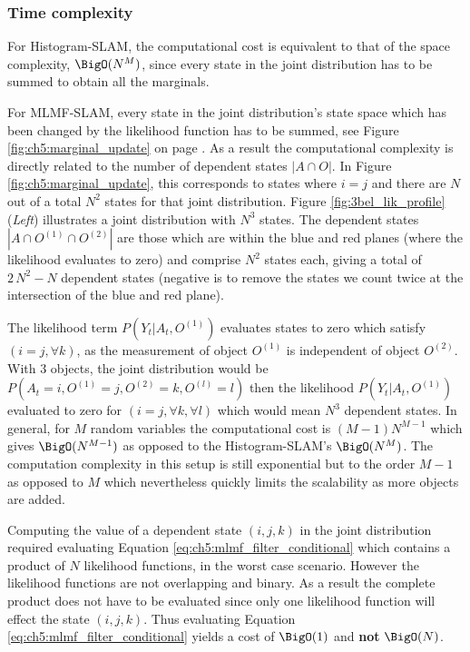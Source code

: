 \subsubsection{Time complexity}

For Histogram-SLAM, the computational cost is equivalent to that of the space complexity, $\BigO(N^M)$,
since every state in the joint distribution has to be summed to obtain all the marginals.

For MLMF-SLAM, every state in the joint distribution's state space which has been changed by the likelihood function 
has to be summed, see Figure \ref{fig:ch5:marginal_update} on page \pageref{fig:ch5:marginal_update}. As a result the computational complexity is directly 
related to the number of dependent states $|A \cap O|$. In Figure \ref{fig:ch5:marginal_update}, this corresponds to states where $i = j$ and there are $N$ out 
of a total $N^2$ states for that joint distribution. Figure \ref{fig:3bel_lik_profile} (\textit{Left})
illustrates a joint distribution with $N^3$ states. The dependent states $|A \cap O^{(1)} \cap O^{(2)}|$ are those which 
are within the blue and red planes (where the likelihood evaluates to zero) and comprise $N^2$ states each, 
giving a total of $2\,N^2 - N$ dependent states (negative is to remove the states we count twice at the intersection of the blue and red plane). 

The likelihood term $P(Y_t|A_t,O^{(1)})$ evaluates states to zero which satisfy ${(i=j,\forall k)}$, as 
the measurement of object $O^{(1)}$ is independent of object $O^{(2)}$. With 3 objects, the joint distribution would be
${P(A_t=i,O^{(1)}=j,O^{(2)}=k,O^{(l)}=l)}$ then the likelihood $P(Y_t|A_t,O^{(1)})$  evaluated to 
zero for ${(i=j,\forall k,\forall l)}$ which would mean $N^3$ dependent states.
In general, for $M$ random variables the computational cost is $(M-1) N^{M-1}$ which gives $\BigO(N^{M-1})$ as opposed to the Histogram-SLAM's $\BigO(N^M)$. 
The computation complexity in this setup is still exponential but to the order $M-1$ as opposed to $M$ which nevertheless 
quickly limits the scalability as more objects are added. 

Computing the value of a dependent state ${(i,j,k)}$ in the joint distribution required evaluating Equation \ref{eq:ch5:mlmf_filter_conditional} which
contains a product of $N$ likelihood functions, in the worst case scenario. However the likelihood functions are not overlapping and binary. As a result the complete product
does not have to be evaluated since only one likelihood function will effect the state ${(i,j,k)}$. Thus evaluating Equation \ref{eq:ch5:mlmf_filter_conditional}
yields a cost of $\BigO(1)$ and \textbf{not} $\BigO(N)$.

